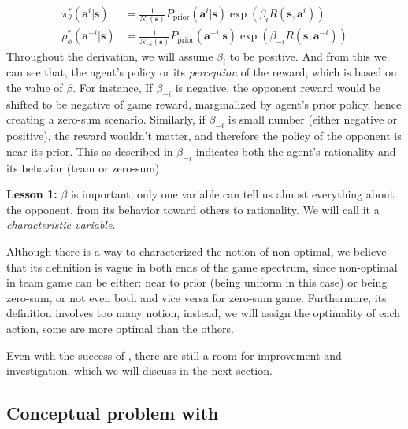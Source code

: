 \begin{equation}
    \begin{aligned}
        \pi_{\theta}^*(\boldsymbol{a}^i | \boldsymbol{s}) &= \frac{1}{N_{i}(\boldsymbol{s})} P_{\text{prior}}(\boldsymbol{a}^i | \boldsymbol{s}) \exp\left( \beta_i R(\boldsymbol{s}, \boldsymbol{a}^i) \right) \\
        \rho_{\phi}^*(\boldsymbol{a}^{-i} | \boldsymbol{s}) &= \frac{1}{N_{-i}(\boldsymbol{s})} P_{\text{prior}}(\boldsymbol{a}^{-i} | \boldsymbol{s}) \exp\left( \beta_{-i} R(\boldsymbol{s}, \boldsymbol{a}^{-i}) \right)
    \end{aligned}
\end{equation}
Throughout the derivation, we will assume $\beta_i$ to be positive. 
And from this we can see that, the agent's policy or its \emph{perception} of the reward, which is based on the value of $\beta$. For instance, If $\beta_{-i}$ is negative, the opponent reward would be shifted to be negative of game reward, marginalized by agent's prior policy, hence creating a zero-sum scenario. Similarly, if $\beta_{-i}$ is small number (either negative or positive), the reward wouldn't matter, and therefore the policy of the opponent is near its prior. This as described in \cite{grau2018balancing} $\beta_{-i}$ indicates both the agent's rationality and its behavior (team or zero-sum).

\begin{tcolorbox}
\textbf{Lesson 1: } $\beta$ is important, only one variable can tell us almost everything about the opponent, from its behavior toward others to rationality. We will call it a \emph{characteristic variable}. 
\end{tcolorbox}
Although there is a way to characterized the notion of non-optimal, we believe that its definition is vague in both ends of the game spectrum, since non-optimal in team game can be either: near to prior (being uniform in this case) or being zero-sum, or not even both and vice versa for zero-sum game. Furthermore, its definition involves too many notion, instead, we will assign the optimality of each action, some are more optimal than the others. 

Even with the success of \cite{grau2018balancing}, there are still a room for improvement and investigation, which we will discuss in the next section.

\subsection{Conceptual problem with \cite{grau2018balancing}}

